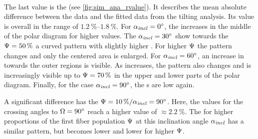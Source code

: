 \paragraph{\rvalue}
The last value is the \rvalue{} (see \cref{fig:sim_ana_rvalue}).
It describes the mean absolute difference between the data and the fitted data from the tilting analysis.
Its value is overall in the range of $\SIrange{1.2}{1.8}{\percent}$.
For $\textnormal{$\alpha_{\mathit{incl}}$} = \SI{0}{\degree}$, the \rvalue{} increases in the middle of the polar diagram for higher \modelPsi{} values.
The $\textnormal{$\alpha_{\mathit{incl}}$} = \SI{30}{\degree}$ show towards the $\textnormal{$\Psi$} = \SI{50}{\percent}$ a curved pattern with slightly higher \rvalue{}.
For higher $\textnormal{$\Psi$}$ the pattern changes and only the centered area is enlarged.
For $\textnormal{$\alpha_{\mathit{incl}}$} = \SI{60}{\degree}$, an increase in \rvalue{} towards the outer regions is visible.
As \modelInc{} increases, the pattern also changes and is increasingly visible up to $\textnormal{$\Psi$}=\SI{70}{\percent}$ in the upper and lower parts of the polar diagram.
Finally, for the case $\textnormal{$\alpha_{\mathit{incl}}$} = \SI{90}{\degree}$, the \rvalue s are low again.
\par
%
A significant difference has the $\textnormal{$\Psi$} = \SI{10}{\percent} / \textnormal{$\alpha_{\mathit{incl}}$} = \SI{90}{\degree}$.
Here, the values for the crossing angles to $\textnormal{$\Omega$} = \SI{90}{\degree}$ reach a higher value of $\approx \SI{2.2}{\percent}$.
The \rvalue{} for higher proportions of the first fiber population $\textnormal{$\Psi$}$ at this inclination angle $\textnormal{$\alpha_{\mathit{incl}}$}$ has a similar pattern, but becomes lower and lower for higher $\textnormal{$\Psi$}$.
%
%
%
%
